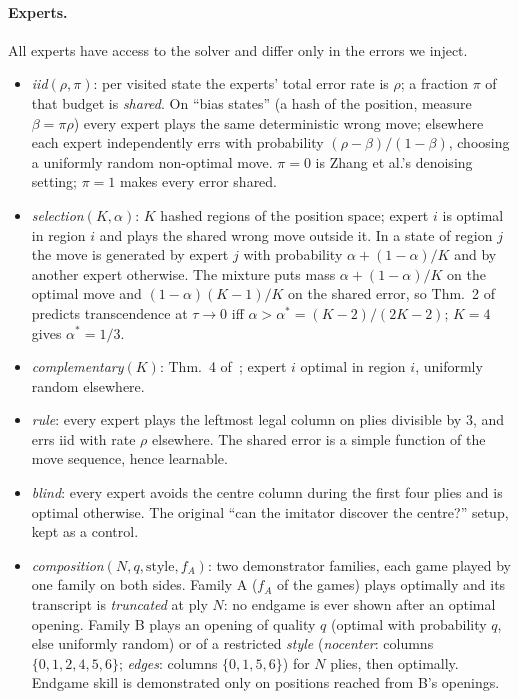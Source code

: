 \documentclass[11pt]{article}
\newcommand{\tauz}{\tau\!\to\!0}
\begin{document}
\paragraph{Experts.} All experts have access to the solver and differ only in the errors we inject.
\begin{itemize}
\item \emph{iid}$(\rho,\pi)$: per visited state the experts' total error rate is $\rho$; a fraction $\pi$ of that budget is \emph{shared}. On ``bias states'' (a hash of the position, measure $\beta=\pi\rho$) every expert plays the same deterministic wrong move; elsewhere each expert independently errs with probability $(\rho-\beta)/(1-\beta)$, choosing a uniformly random non-optimal move. $\pi=0$ is Zhang et al.'s denoising setting; $\pi=1$ makes every error shared.
\item \emph{selection}$(K,\alpha)$: $K$ hashed regions of the position space; expert $i$ is optimal in region $i$ and plays the shared wrong move outside it. In a state of region $j$ the move is generated by expert $j$ with probability $\alpha+(1-\alpha)/K$ and by another expert otherwise. The mixture puts mass $\alpha+(1-\alpha)/K$ on the optimal move and $(1-\alpha)(K-1)/K$ on the shared error, so Thm.~2 of~\cite{zhang2024transcendence} predicts transcendence at $\tauz$ iff $\alpha>\alpha^*=(K-2)/(2K-2)$; $K=4$ gives $\alpha^*=1/3$.
\item \emph{complementary}$(K)$: Thm.~4 of~\cite{zhang2024transcendence}; expert $i$ optimal in region $i$, uniformly random elsewhere.
\item \emph{rule}: every expert plays the leftmost legal column on plies divisible by 3, and errs iid with rate $\rho$ elsewhere. The shared error is a simple function of the move sequence, hence learnable.
\item \emph{blind}: every expert avoids the centre column during the first four plies and is optimal otherwise. The original ``can the imitator discover the centre?'' setup, kept as a control.
\item \emph{composition}$(N,q,\text{style},f_A)$: two demonstrator families, each game played by one family on both sides. Family A ($f_A$ of the games) plays optimally and its transcript is \emph{truncated} at ply $N$: no endgame is ever shown after an optimal opening. Family B plays an opening of quality $q$ (optimal with probability $q$, else uniformly random) or of a restricted \emph{style} (\emph{nocenter}: columns $\{0,1,2,4,5,6\}$; \emph{edges}: columns $\{0,1,5,6\}$) for $N$ plies, then optimally. Endgame skill is demonstrated only on positions reached from B's openings.
\end{itemize}
\end{document}

